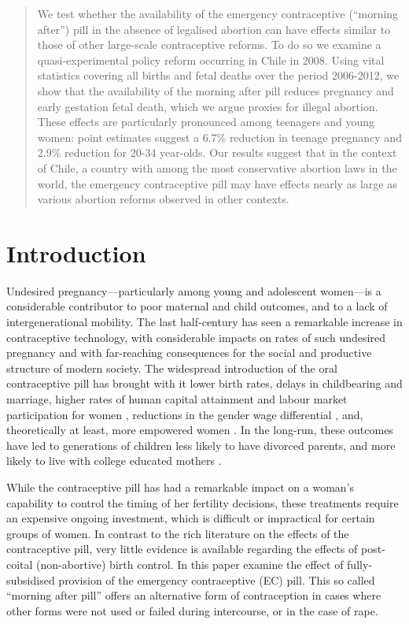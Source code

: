 \vspace{-5mm}
\begin{abstract}
We test whether the availability of the emergency contraceptive (``morning 
after'') pill in the absence of legalised abortion can have effects similar to 
those of other large-scale contraceptive reforms. To do so we examine a 
quasi-experimental policy reform occurring in Chile in 2008. Using vital 
statistics covering all births and fetal deaths over the period 2006-2012, we 
show that the availability of the morning after pill reduces pregnancy and early 
gestation fetal death, which we argue proxies for illegal abortion. These effects 
are particularly pronounced among teenagers and young women: point estimates 
suggest a 6.7\% reduction in teenage pregnancy and 2.9\% reduction for
20-34 year-olds. Our results suggest that in the context of Chile, a country
with among the most conservative abortion laws in the world, the emergency
contraceptive pill may have effects nearly as large as various abortion reforms
observed in other contexts.
\\ \JELs 
\end{abstract}

\section{Introduction}
Undesired pregnancy---particularly among young and adolescent women---is a
considerable contributor to poor maternal and child outcomes, and to a lack of
intergenerational mobility.  The last half-century has seen a remarkable 
increase in contraceptive technology, with considerable impacts on rates of such
undesired pregnancy and with far-reaching consequences for the social and 
productive structure of modern society. The widespread introduction of the oral 
contraceptive pill has brought with it lower birth rates, delays in childbearing 
and marriage, higher rates of human capital attainment and labour market 
participation for women \citep{Bailey2006,Bailey2009,GoldinKatz2002a,
GoldinKatz2002b}, reductions in the gender wage differential 
\citep{Baileyetal2012}, and, theoretically at least, more empowered women 
\citep{ChiapporiOreffice2008}.  In the long-run, these outcomes have led to 
generations of children less likely to have divorced parents, and more likely to 
live with college educated mothers \citep{OltmansHungerman2012}.

While the contraceptive pill has had a remarkable impact on a woman's capability
to control the timing of her fertility decisions, these treatments require an
expensive ongoing investment, which is difficult or impractical for certain 
groups of women.  In contrast to the rich literature on the effects of the 
contraceptive pill, very little evidence is available regarding the effects of 
post-coital (non-abortive) birth control.  In this paper \person examine the 
effect of fully-subsidised provision of the emergency contraceptive (EC) pill.  
This so called ``morning after pill'' offers an alternative form of 
contraception in cases where other forms were not used or failed during 
intercourse, or in the case of rape.

